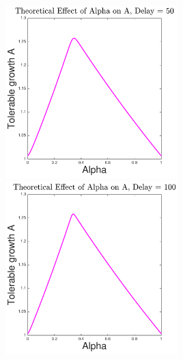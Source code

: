 \documentclass[leqno,twocolumn]{article}
\begin{document}
\includegraphics[width=0.5\textwidth]{150424_alphvsa_d50}
\includegraphics[width=0.5\textwidth]{150424_alphvsa_d100}\\
\end{document}

